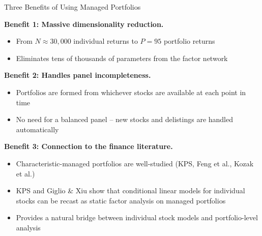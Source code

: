 \documentclass[aspectratio=169]{beamer}
\begin{document}
\begin{frame}{Three Benefits of Using Managed Portfolios}

\textbf{Benefit 1: Massive dimensionality reduction.}
\begin{itemize}
    \item From $N \approx 30{,}000$ individual returns to $P = 95$ portfolio returns
    \item Eliminates tens of thousands of parameters from the factor network
\end{itemize}

\vspace{0.3em}
\textbf{Benefit 2: Handles panel incompleteness.}
\begin{itemize}
    \item Portfolios are formed from whichever stocks are available at each point in time
    \item No need for a balanced panel -- new stocks and delistings are handled automatically
\end{itemize}

\vspace{0.3em}
\textbf{Benefit 3: Connection to the finance literature.}
\begin{itemize}
    \item Characteristic-managed portfolios are well-studied (KPS, Feng et al., Kozak et al.)
    \item KPS and Giglio \& Xiu show that conditional linear models for individual stocks can be recast as static factor analysis on managed portfolios
    \item Provides a natural bridge between individual stock models and portfolio-level analysis
\end{itemize}
\end{frame}
%
%
\end{document}
